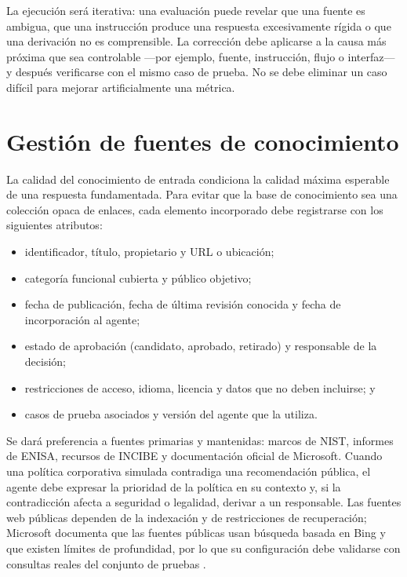 \documentclass[12pt,twoside,titlepage]{book}
\begin{document}
La ejecución será iterativa: una evaluación puede revelar que una fuente es
ambigua, que una instrucción produce una respuesta excesivamente rígida o que una
derivación no es comprensible. La corrección debe aplicarse a la causa más
próxima que sea controlable ---por ejemplo, fuente, instrucción, flujo o
interfaz--- y después verificarse con el mismo caso de prueba. No se debe
eliminar un caso difícil para mejorar artificialmente una métrica.

\section{Gestión de fuentes de conocimiento}
\label{sec:gestion-fuentes}

La calidad del conocimiento de entrada condiciona la calidad máxima esperable de
una respuesta fundamentada. Para evitar que la base de conocimiento sea una
colección opaca de enlaces, cada elemento incorporado debe registrarse con los
siguientes atributos:

\begin{itemize}
  \item identificador, título, propietario y URL o ubicación;
  \item categoría funcional cubierta y público objetivo;
  \item fecha de publicación, fecha de última revisión conocida y fecha de
  incorporación al agente;
  \item estado de aprobación (candidato, aprobado, retirado) y responsable de la
  decisión;
  \item restricciones de acceso, idioma, licencia y datos que no deben incluirse;
  y
  \item casos de prueba asociados y versión del agente que la utiliza.
\end{itemize}

Se dará preferencia a fuentes primarias y mantenidas: marcos de NIST, informes de
ENISA, recursos de INCIBE y documentación oficial de Microsoft. Cuando una
política corporativa simulada contradiga una recomendación pública, el agente
debe expresar la prioridad de la política en su contexto y, si la contradicción
afecta a seguridad o legalidad, derivar a un responsable. Las fuentes web
públicas dependen de la indexación y de restricciones de recuperación; Microsoft
documenta que las fuentes públicas usan búsqueda basada en Bing y que existen
límites de profundidad, por lo que su configuración debe validarse con consultas
reales del conjunto de pruebas \cite{copilotPublicWeb}.
\end{document}
